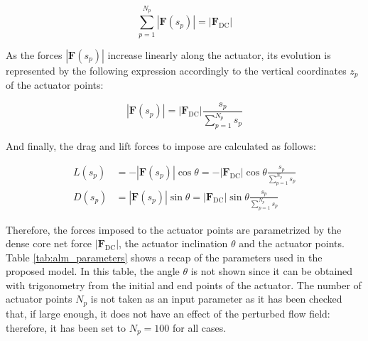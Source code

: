 \begin{equation}
\sum_{p=1}^{N_p} | \textbf{F} \left( s_p \right)| = | \textbf{F}_\mathrm{DC} |
\end{equation}

As the forces $| \textbf{F} \left( s_p \right)|$ increase linearly along the actuator, its evolution is represented by the following expression accordingly to the vertical coordinates $z_p$ of the actuator points:

\begin{equation}
|\textbf{F} \left( s_p \right) | = | \textbf{F}_\mathrm{DC} | \frac{s_p}{\sum_{p=1}^{N_p} s_p}
\end{equation}

And finally, the drag and lift forces to impose are calculated as follows:

\begin{subequations}
\label{eq:ALM_SLI_lift_drag_definitions}
\begin{align}
L \left( s_p \right) &= - |\textbf{F} \left( s_p \right) | \cos \theta = - | \textbf{F}_\mathrm{DC} | \cos \theta \frac{s_p}{\sum_{p=1}^{N_p} s_p} \\
D \left( s_p \right) &= |\textbf{F} \left( s_p \right) | \sin \theta = | \textbf{F}_\mathrm{DC} | \sin \theta \frac{s_p}{\sum_{p=1}^{N_p} s_p}
\end{align}
\end{subequations}

Therefore, the forces imposed to the actuator points are parametrized by the dense core net force $| \textbf{F}_\mathrm{DC} |$, the actuator inclination $\theta$ and the actuator points. Table \ref{tab:alm_parameters} shows a recap of the parameters used in the proposed model. In this table, the angle $\theta$ is not shown since it can be obtained with trigonometry from the initial and end points of the actuator. The number of actuator points $N_p$ is not taken as an input parameter as it has been checked that, if large enough, it does not have an effect of the perturbed flow field: therefore, it has been set to $N_p = 100$ for all cases.


